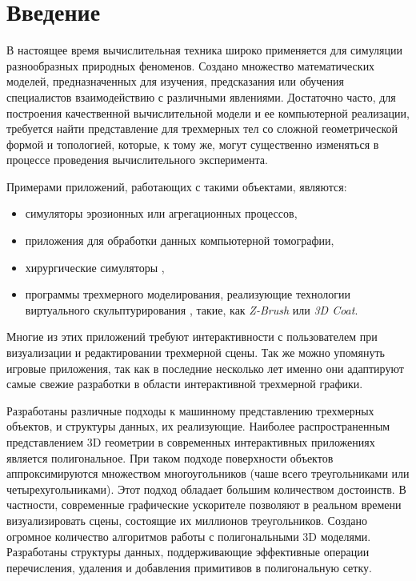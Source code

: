 \chapter*{Введение}

В настоящее время вычислительная техника широко применяется для симуляции разнообразных природных феноменов. Создано множество математических моделей, предназначенных для изучения, предсказания или обучения специалистов взаимодействию с различными явлениями. Достаточно часто, для построения качественной вычислительной модели и ее компьютерной реализации, требуется найти представление для трехмерных тел со сложной геометрической формой и топологией, которые, к тому же, могут существенно изменяться в процессе проведения вычислительного эксперимента.

Примерами приложений, работающих с такими объектами, являются:
\begin{itemize}
\item симуляторы эрозионных \cite{erosion} или агрегационных процессов,
\item приложения для обработки данных компьютерной томографии,
\item хирургические симуляторы \cite{surgery},
\item программы трехмерного моделирования, реализующие технологии виртуального скульптурирования \cite{sculpt}, такие, как \emph{Z-Brush} или \emph{3D Coat}.
\end{itemize}

Многие из этих приложений требуют интерактивности с пользователем при визуализации и редактировании трехмерной сцены. Так же можно упомянуть игровые приложения, так как в последние несколько лет именно они адаптируют самые свежие разработки в области интерактивной трехмерной графики.

Разработаны различные подходы к машинному представлению трехмерных объектов, и структуры данных, их реализующие\cite{graphics_gems}. Наиболее распространенным представлением 3D геометрии в современных интерактивных приложениях является полигональное. При таком подходе поверхности объектов аппроксимируются множеством многоугольников (чаше всего треугольниками или четырехугольниками). Этот подход обладает большим количеством достоинств. В частности, современные графические ускорителе позволяют в реальном времени визуализировать сцены, состоящие их миллионов треугольников. Создано огромное количество алгоритмов работы с полигональными 3D моделями. Разработаны структуры данных, поддерживающие эффективные операции перечисления, удаления и добавления примитивов в полигональную сетку\cite{halfedge}.

